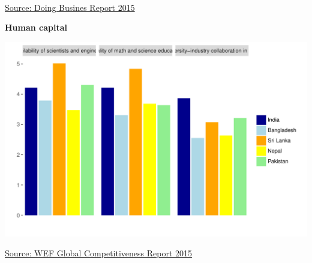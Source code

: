 \documentclass{article}\usepackage[]{graphicx}\usepackage[]{color}
\makeatletter
\def\maxwidth{ %
  \ifdim\Gin@nat@width>\linewidth
    \linewidth
  \else
    \Gin@nat@width
  \fi
}
\makeatother
\begin{document}
\begin{minipage}[b]{0.875\textwidth}
\begin{minipage}[c]{0.55\textwidth}
{      }
    \\[15pt]
     \raggedright{\footnotesize{\href{http://www.doingbusiness.org/data}{Source: Doing Busines Report 2015}}}
  \end{minipage}
\end{minipage}

{\color{blue!50!white}\noindent\makebox[\linewidth]{\rule{18cm}{0.3pt}}} %


\begin{minipage}[b]{0.875\textwidth}
   \vspace{2ex}
   \begin{flushleft}  
     {\color{blue!20!black} \textbf{\LARGE Human capital}}
   \end{flushleft} 
\vspace{0.5cm}
  \begin{minipage}[c]{0.48\textwidth} %


{\centering \includegraphics[width=\maxwidth]{figure/bar_facewrap_chart_Human-1} 

}



    \vspace*{-0.6cm} 
    \hspace*{0.3cm} \raggedright\footnotesize{\href{http://www.weforum.org/global-competitiveness-report-2015-2016}{Source: WEF Global Competitiveness Report 2015}}
  \end{minipage}
  \begin{minipage}[c]{0.50\textwidth} %
    \vspace*{-0.6cm}



\end{minipage}
\end{minipage}
\end{document}
